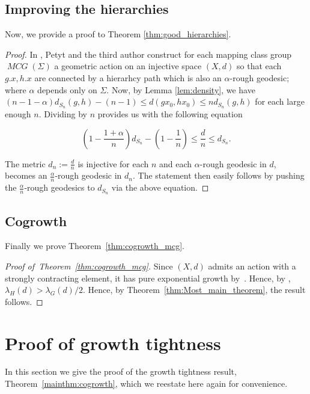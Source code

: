 \documentclass{amsart}
\numberwithin{thm}{section}
\numberwithin{figure}{section}
\theoremstyle{definition}
\theoremstyle{definition}
\theoremstyle{remark}
\numberwithin{equation}{section}
\DeclareMathOperator{\MCG}{\mathit{MCG}}
\theoremstyle{plain}
\begin{document}
\subsection{Improving the hierarchies}

Now, we provide a proof to Theorem \ref{thm:good_hierarchies}.

\begin{proof} In \cite[Theorem~H]{PetytZalloum24}, Petyt and the third author construct for each mapping class group $\MCG(\Sigma)$ a geometric action on an injective space $(X,d)$ so that each $g.x,h.x$ are connected by a hierarhcy path which is also an $\alpha$-rough geodesic; where $\alpha$ depends only on $\Sigma$. Now, by Lemma \ref{lem:density}, we have $(n-1-\alpha)d_{S_n}(g,h)-(n-1) \leq d(gx_0,hx_0) \leq n d_{S_n}(g,h)$ for each large enough $n.$ Dividing by $n$ provides us with the following equation

$$\left(1-\frac{1+\alpha}{n}\right)d_{S_n} - \left(1-\frac{1}{n}\right) \leq \frac{d}{n} \leq d_{S_n}.$$

The metric $d_n:=\frac{d}{n}$ is injective for each $n$ and each $\alpha$-rough geodesic in $d$, becomes an $\frac{\alpha}{n}$-rough geodesic in $d_n$. The statement then easily follows by pushing the $\frac{\alpha}{n}$-rough geodesics to $d_{S_n}$ via the above equation.

\end{proof}


\subsection{Cogrowth} Finally we prove Theorem~\ref{thm:cogrowth_mcg}.

\begin{proof}[Proof of~Theorem~\ref{thm:cogrowth_mcg}]
Since $(X,d)$ admits an action with a strongly contracting element, it has pure exponential growth by~\cite{Yang17:ConvexCocompact}.
Hence, by \cite[Theorem~1.13]{CGZ24:Confined}, $\lambda_H(d) > \lambda_{G}(d)/2$. Hence, by Theorem~\ref{thm:Most_main_theorem}, the result follows.
\end{proof}





\section{Proof of growth tightness}
\label{sec:proof_GrowthTightness}

In this section we give the proof of the growth tightness result, Theorem~\ref{mainthm:cogrowth}, which we reestate here again for convenience.
\end{document}
